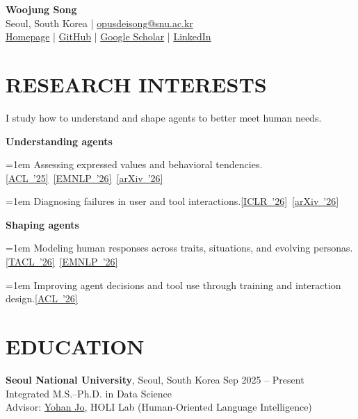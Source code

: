 \documentclass[a4paper,10pt]{extarticle}
\newcommand{\researchline}[2]{%
    \noindent\hangindent=1em\hangafter=0 #1\enspace\mbox{#2}\par
}
\begin{document}
\pagestyle{fancy}
\fancyhf{}
\renewcommand{\headrulewidth}{0pt}
\fancyfoot[R]{\footnotesize \thepage}

\begin{center}
{\fontsize{20}{24}\selectfont\bfseries Woojung Song}\\[4pt]
Seoul, South Korea | \href{mailto:opusdeisong@snu.ac.kr}{opusdeisong@snu.ac.kr}\\[2pt]
\href{https://opusdeisong.github.io/}{Homepage} | \href{https://github.com/opusdeisong}{GitHub} | \href{https://scholar.google.com/citations?user=sasPr4EAAAAJ}{Google Scholar} | \href{https://www.linkedin.com/in/opusdeisong/}{LinkedIn}
\end{center}

\section*{RESEARCH INTERESTS}
{\raggedright
I study how to understand and shape agents to better meet human needs.\par
\smallskip
\textbf{Understanding agents}\par
\researchline{Assessing expressed values and behavioral tendencies.}{\href{https://aclanthology.org/2025.acl-long.838/}{[ACL~'25]} \href{https://aclanthology.org/2026.emnlp-main.1993/}{[EMNLP~'26]} \href{https://arxiv.org/abs/2609.32795}{[arXiv~'26]}}
\researchline{Diagnosing failures in user and tool interactions.}{\href{https://openreview.net/forum?id=UAUimofy3W}{[ICLR~'26]} \href{https://arxiv.org/abs/2609.05587}{[arXiv~'26]}}
\smallskip
\textbf{Shaping agents}\par
\researchline{Modeling human responses across traits, situations, and evolving personas.}{\href{https://aclanthology.org/2026.tacl-1.63/}{[TACL~'26]} \href{https://aclanthology.org/2026.emnlp-main.1998/}{[EMNLP~'26]}}
\researchline{Improving agent decisions and tool use through training and interaction design.}{\href{https://aclanthology.org/2026.acl-long.948/}{[ACL~'26]}}
}

\section*{EDUCATION}
\noindent
\textbf{Seoul National University}, Seoul, South Korea \hfill Sep 2025 -- Present \\
Integrated M.S.--Ph.D. in Data Science\\
Advisor: \href{https://yohanjo.github.io/}{Yohan Jo}, HOLI Lab (Human-Oriented Language Intelligence)
\end{document}
